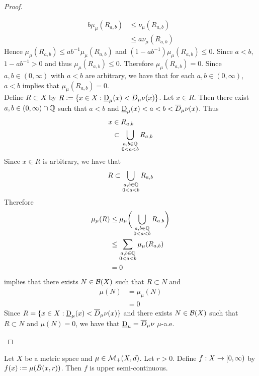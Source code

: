 \documentclass{book}
\begin{document}
\begin{proof}
\begin{enumerate}
			\begin{align*}
				b\mu_{\mu}(R_{a,b}) 
				& \leq \nu_{\mu}(R_{a,b}) \\
				& \leq a \nu_{\mu}(R_{a,b}) 
			\end{align*}
			Hence $\mu_{\mu}(R_{a,b}) \leq ab^{-1} \mu_{\mu}(R_{a,b})$ and $(1 - ab^{-1}) \mu_{\mu}(R_{a,b}) \leq 0$. Since $a < b$, $1- ab^{-1} > 0$ and thus $\mu_{\mu}(R_{a,b}) \leq 0$. Therefore $\mu_{\mu}(R_{a,b}) = 0$. Since $a,b \in (0,\infty)$ with $a < b$ are arbitrary, we have that for each $a,b \in (0,\infty)$, $a < b$ implies that $\mu_{\mu}(R_{a,b}) = 0$. \\
			
			Define $R \subset X$ by $R \vcentcolon= \{x \in X:  \underbar{D}_{\mu}(x) < \overline{D}_{\mu} \nu (x)\}$. Let $x \in R$. Then there exist $a,b \in (0, \infty) \cap \mathbb{Q}$ such that $a < b$ and $\underbar{D}_{\mu}(x) < a < b < \overline{D}_{\mu} \nu (x)$. Thus 
			\begin{align*}
				x 
				& \in R_{a,b} \\ 
				& \subset \bigcup_{\substack{a,b \in \mathbb{Q} \\ 0 < a < b}} R_{a,b}
			\end{align*}
			Since $x \in R$ is arbitrary, we have that 
			$$R \subset \bigcup\limits_{\substack{a,b \in \mathbb{Q} \\ 0 < a < b}} R_{a,b}$$ 
			Therefore 
			\begin{align*}
				\mu_{\mu}(R) 
				& \leq \mu_{\mu} \bigg( \bigcup_{\substack{a,b \in \mathbb{Q} \\ 0 < a < b}} R_{a,b} \bigg) \\
				& \leq \sum_{\substack{a,b \in \mathbb{Q} \\ 0 < a < b}} \mu_{\mu}(R_{a,b}) \\
				& = 0
			\end{align*}
			 implies that there exists $N \in \mathcal{B}(X)$ such that $R \subset N$ and 
			\begin{align*}
				\mu(N) 
				& = \mu_{\mu}(N) \\
				& = 0
			\end{align*}
			Since $R = \{x \in X:  \underbar{D}_{\mu}(x) < \overline{D}_{\mu} \nu (x)\}$ and there exists $N \in \mathcal{B}(X)$ such that $R \subset N$ and $\mu(N) = 0$, we have that $\underbar{D}_{\mu} = \overline{D}_{\mu} \nu$ $\mu$-a.e.
		\end{enumerate}
	\end{proof}

	\begin{ex} 
		Let $X$ be a metric space and $\mu \in \mathcal{M}_+(X, d)$. Let $r > 0$. Define $f: X \rightarrow [0,\infty)$ by $f(x) \vcentcolon= \mu(\bar{B}(x, r))$. Then $f$ is upper semi-continuous.
	\end{ex}
	
\end{document}
